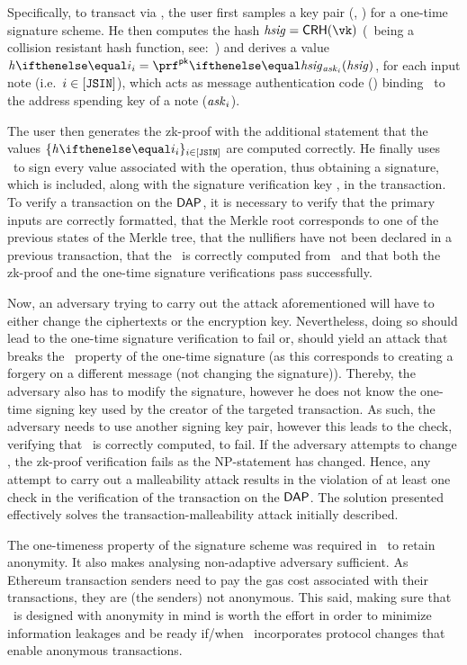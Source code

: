 Specifically, to transact via \zeth, the user first samples a key pair (\sk, \vk) for a one-time signature scheme. He then computes the hash $\hsig = \crh(\vk)$ (\crh~being a collision resistant hash function, see:~\cite{sasson2014zerocash}) and derives a value $\htag{i} = \prfpk{\ask_{i}}{\hsig}$, for each input note (i.e.~$i \in [\mathtt{JSIN}]$), which acts as message authentication code (\mmac) binding \hsig~to the address spending key of a note ($\mathit{ask}_{i}$).

The user then generates the zk-proof with the additional statement that the values $\indexedset{\htag{i}}{i \in [\jsin]}$ are computed correctly. He finally uses \sk~to sign every value associated with the operation, thus obtaining a signature, which is included, along with the signature verification key \vk, in the transaction.
To verify a transaction on the $\mathsf{DAP}$, it is necessary to verify that the primary inputs are correctly formatted, that the Merkle root corresponds to one of the previous states of the Merkle tree, that the nullifiers have not been declared in a previous transaction, that the \hsig~is correctly computed from \vk~and that both the zk-proof and the one-time signature verifications pass successfully.

Now, an adversary trying to carry out the attack aforementioned will have to either change the ciphertexts or the encryption key. Nevertheless, doing so should lead to the one-time signature verification to fail or, should yield an attack that breaks the \ufcma~property of the one-time signature (as this corresponds to creating a forgery on a different message (not changing the signature)). Thereby, the adversary also has to modify the signature, however he does not know the one-time signing key used by the creator of the targeted transaction. As such, the adversary needs to use another signing key pair, however this leads to the check, verifying that \hsig~is correctly computed, to fail. If the adversary attempts to change \hsig, the zk-proof verification fails as the NP-statement has changed. Hence, any attempt to carry out a malleability attack results in the violation of at least one check in the verification of the transaction on the $\mathsf{DAP}$. The solution presented effectively solves the transaction-malleability attack initially described.

\begin{remark}
    The one-timeness property of the signature scheme was required in \zerocash~to retain anonymity. It also makes analysing non-adaptive adversary sufficient. As Ethereum transaction senders need to pay the gas cost associated with their transactions, they are (the senders) not anonymous. This said, making sure that \zeth~is designed with anonymity in mind is worth the effort in order to minimize information leakages and be ready if/when \ethereum~incorporates protocol changes that enable anonymous transactions.
\end{remark}

